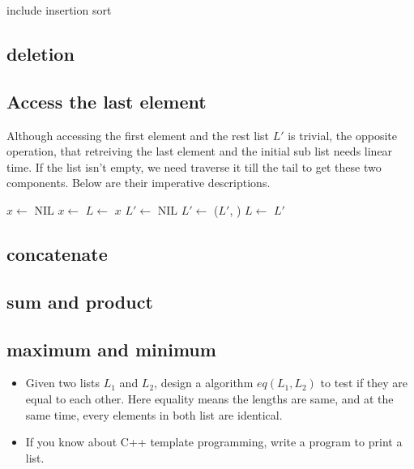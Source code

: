\documentclass{article}
\begin{document}
include insertion sort

\subsection{deletion}

\subsection{Access the last element}
Although accessing the first element and the rest list $L'$ is trivial, the opposite operation, that
retreiving the last element and the initial sub list needs linear time. If the list isn't empty, we
need traverse it till the tail to get these two components. Below are their imperative descriptions.

\begin{algorithmic}
  \State $x \gets $ NIL
    \State $x \gets $ 
    \State $L \gets $ 
  \EndWhile
  \State \Return $x$
\EndFunction
\Statex
{}
  \State $L' \gets $ NIL
    \State $L' \gets$ ($L'$, )
    \State $L \gets $ 
  \EndWhile
  \State \Return $L'$
\EndFunction
\end{algorithmic}

\subsection{concatenate}

\subsection{sum and product}

\subsection{maximum and minimum}

\begin{Exercise}
\begin{itemize}
\item Given two lists $L_1$ and $L_2$, design a algorithm $eq(L_1, L_2)$ to test if they are equal to each other.
Here equality means the lengths are same, and at the same time, every elements in both list are identical.
\item If you know about C++ template programming, write a program to print a list.
\end{itemize}
\end{Exercise}
\end{document}
